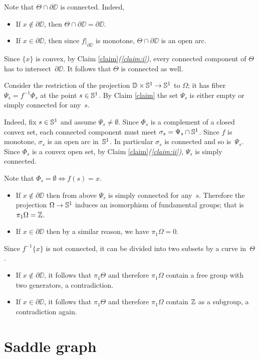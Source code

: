 \documentclass{article}
\begin{document}
Note that $\Theta\cap \partial\DD$ is connected.
Indeed,
\begin{itemize}
\item If $x\notin \partial\DD$, then $\Theta\cap \partial\DD=\partial \DD$. 
\item If $x\in \partial\DD$, then since $f|_{\partial\DD}$ is monotone, $\Theta\cap \partial\DD$ is an open arc.
\end{itemize}
Since $\{x\}$ is convex, by Claim \ref{claim}\textit{(\ref{claim:i})}, every connected component of $\Theta$ has to intersect~$\partial\DD$.
It follows that $\Theta$ is connected as well.

Consider the restriction of the projection $\mathbb{D}\times\mathbb{S}^1\to \mathbb{S}^1$ to $\Omega$;
it has fiber $\Psi_s=f^{-1}\Phi_s$ at the point $s\in\mathbb{S}^1$.
By Claim \ref{claim} the set $\Psi_s$ is either empty or simply connected for any~$s$.

Indeed, fix $s\in\mathbb{S}^1$ and assume $\Psi_s\ne \emptyset$.
Since $\Phi_s$ is a complement of a closed convex set,
each connected component must meet $\sigma_s=\Psi_s\cap\mathbb{S}^1$.
Since $f$ is monotone, $\sigma_s$ is an open arc in~$\mathbb{S}^1$.
In particular $\sigma_s$ is connected and so is~$\Psi_s$.
Since $\Phi_s$ is a convex open set, by Claim \ref{claim}\textit{(\ref{claim:ii})}, $\Psi_s$ is simply connected.

Note that $\Phi_s=\emptyset\iff f(s)=x$.
\begin{itemize}
\item If $x\notin\partial\DD$ then from above $\Psi_s$ is simply connected for any~$s$.
Therefore the projection $\Omega\to \mathbb{S}^1$ induces an isomorphism of fundamental groups; that is $\pi_1\Omega=\mathbb{Z}$.
\item If $x\in\partial\DD$ then by a similar reason, we have $\pi_1\Omega=0$.
\end{itemize}

Since $f^{-1}\{x\}$ is not connected, it can be divided into two subsets by a curve in~$\Theta$.
\begin{itemize}
\item If $x\notin\partial \DD$, it follows that $\pi_1\Theta$ and therefore $\pi_1\Omega$ contain a free group with two generators, a contradiction.
\item If $x\in\partial\DD$, it follows that $\pi_1\Theta$ and therefore $\pi_1\Omega$ contain $\mathbb{Z}$ as a subgroup, a contradiction again.\qeds
\end{itemize}

\section{Saddle graph}
\end{document}
